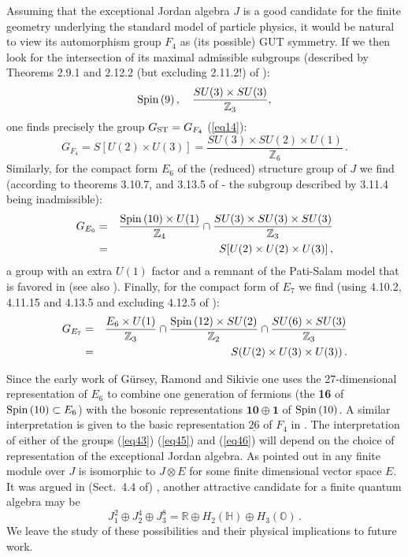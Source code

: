 \documentclass{article}
\newcommand{\be}{\begin{equation}}
\newcommand{\ee}{\end{equation}}
\begin{document}
Assuming that the exceptional Jordan algebra $J$ is a good candidate for the finite geometry underlying the standard model of particle physics, it would be natural to view its automorphism group $F_4$ as (its possible) GUT symmetry. If we then look for the intersection of its maximal admissible subgroups (described by Theorems 2.9.1 and 2.12.2 (but excluding 2.11.2!) of \cite{Y}):
\be
\label{eq43}
{\rm Spin} \, (9) \, , \quad \frac{SU (3) \times SU (3)}{{\mathbb Z}_3},  
\ee
one finds precisely the group $G_{\rm ST} = G_{F_4}$ (\ref{eq14}):
\be
\label{eq44}
G_{F_4} = S[U(2) \times U(3)] = \frac{SU (3) \times SU (2) \times U(1)}{{\mathbb Z}_6} \, . 
\ee
 Similarly, for the compact form $E_6$ of the (reduced) structure group of $J$ we find (according to theorems 3.10.7,  and 3.13.5 of \cite{Y} - the subgroup described by 3.11.4 being inadmissible):
\begin{eqnarray}
\label{eq45}
G_{E_6} &= &\frac{{\rm Spin} \, (10) \times U (1)}{{\mathbb Z}_4} \cap \frac{SU (3) \times SU (3) \times SU(3)}{{\mathbb Z}_3} \nonumber \\
&= &S[U(2) \times U(2) \times U(3)] \, , 
\end{eqnarray}
a group with an extra $U(1)$ factor and a remnant of the Pati-Salam model that is favored in \cite{CCS} (see also \cite{BF}). Finally, for the compact form of $E_7$ we find  (using 4.10.2, 4.11.15 and 4.13.5 and excluding  4.12.5 of \cite{Y}):
\begin{eqnarray}
\label{eq46}
G_{E_7} &= &\frac{E_6 \times U (1)}{{\mathbb Z}_3} \cap \frac{{\rm Spin} \, (12) \times SU (2)}{{\mathbb Z}_2} \cap \frac{SU (6) \times SU (3)}{{\mathbb Z}_3} \nonumber \\
&= &S(U(2) \times U(3) \times U(3)) \, .
\end{eqnarray}

Since the early work of G\"ursey, Ramond and Sikivie \cite{GRS} one uses the 27-dimensional representation of $E_6$ to combine one generation of fermions (the {\bf 16} of ${\rm Spin} \, (10) \subset E_6$) with the bosonic representations $\bm{10} \oplus {\bm 1}$ of ${\rm Spin} \, (10)$. A similar interpretation is given to the basic representation  $\underline{26}$ of $F_4$ in
\cite{TD}. The interpretation of either of the groups (\ref{eq43}) (\ref{eq45}) and (\ref{eq46}) will depend on the choice of representation of the exceptional Jordan algebra. As pointed out in \cite{DV} any finite module over $J$ is isomorphic to $J \otimes E$ for some finite dimensional vector space $E$.  It was argued in (Sect.~4.4 of) \cite{DV}, another attractive candidate for a finite quantum algebra may be
\be
\label{eq47}
J_1^2 \oplus J_2^4 \oplus J_3^8 = {\mathbb R} \oplus H_2 ({\mathbb H}) \oplus H_3 ({\mathbb O}) \, .
\ee
We leave the study of these possibilities and their physical implications to future work.
\end{document}
